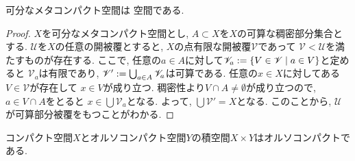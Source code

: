 \documentclass[uplatex, dvipdfmx, a4paper, 12pt, class=jsbook, crop=false]{standalone}
\begin{document}
\begin{proposition}
	可分なメタコンパクト空間は \Lindelof 空間である.
\end{proposition}

\begin{proof}
	$ X $を可分なメタコンパクト空間とし, $ A \subset X $を$ X $の可算な稠密部分集合とする. 
	$ \mathscr{U} $を$ X $の任意の開被覆とすると, $ X $の点有限な開被覆$ \mathscr{V} $であって
	$ \mathscr{V} < \mathscr{U} $を満たすものが存在する. 
	ここで, 任意の$ a \in A $に対して$ \mathscr{V}_a \defeq \setcomp{V \in \mathscr{V}}{a \in V} $と定めると
	$ \mathscr{V}_a $は有限であり, $ \mathscr{V}' \mathrel{:=} \bigcup_{a \in A} \mathscr{V}_a $は可算である. 
	任意の$ x \in X $に対してある$ V \in \mathscr{V} $が存在して
	$ x \in V $が成り立つ. 稠密性より$ V \cap A \neq \emptyset $が成り立つので, $ a \in V \cap A $をとると
	$ x \in \bigcup \mathscr{V}_a $となる. よって, $ \bigcup \mathscr{V}' = X $となる. 
	このことから, $ \mathscr{U} $が可算部分被覆をもつことがわかる.
\end{proof} 

\begin{proposition}
	コンパクト空間$ X $とオルソコンパクト空間$ Y $の積空間$ X \times Y $はオルソコンパクトである.
\end{proposition}
\end{document}
